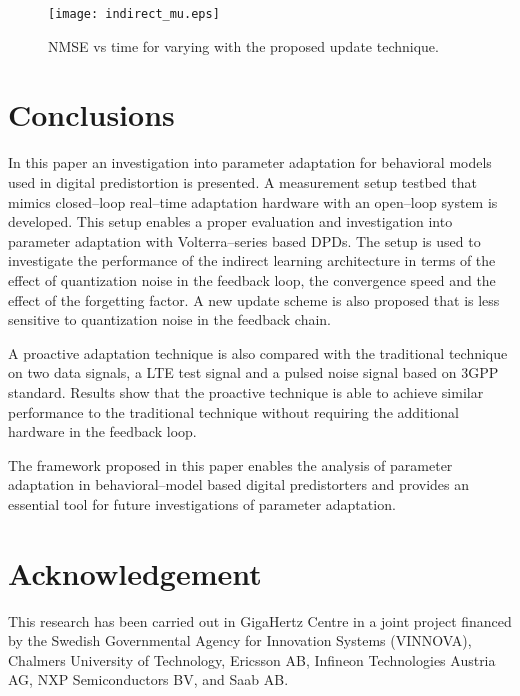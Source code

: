 \documentclass[journal]{IEEEtran}
\begin{document}
\begin{figure}
\centering
\texttt{[image: indirect\_mu.eps]}
\caption{NMSE vs time for varying  with the proposed update technique.} \label{indir}
\end{figure}


\section{Conclusions}
In this paper an investigation into parameter adaptation for behavioral models used in digital predistortion is presented. A measurement setup testbed that mimics closed--loop real--time adaptation hardware with an open--loop system is developed. This setup enables a proper evaluation and investigation into parameter adaptation with Volterra--series based DPDs. The setup is used to investigate the performance of the indirect learning architecture in terms of the effect of quantization noise in the feedback loop, the convergence speed and the effect of the forgetting factor. A new update scheme is also proposed that is less sensitive to quantization noise in the feedback chain.

A proactive adaptation technique is also compared with the traditional technique on two data signals, a LTE test signal and a pulsed noise signal based on 3GPP standard. Results show that the proactive technique is able to achieve similar performance to the traditional technique without requiring the additional hardware in the feedback loop.

The framework proposed in this paper enables the analysis of parameter adaptation in behavioral--model based digital predistorters and provides an essential tool for future investigations of parameter adaptation.
\section*{Acknowledgement}
This research has been carried out in GigaHertz Centre in a joint project financed by the Swedish Governmental Agency
for Innovation Systems (VINNOVA), Chalmers University of Technology, Ericsson AB, Infineon Technologies Austria AG, NXP Semiconductors BV, and Saab AB.


\ifCLASSOPTIONcaptionsoff
  \newpage
\fi




















\end{document}
